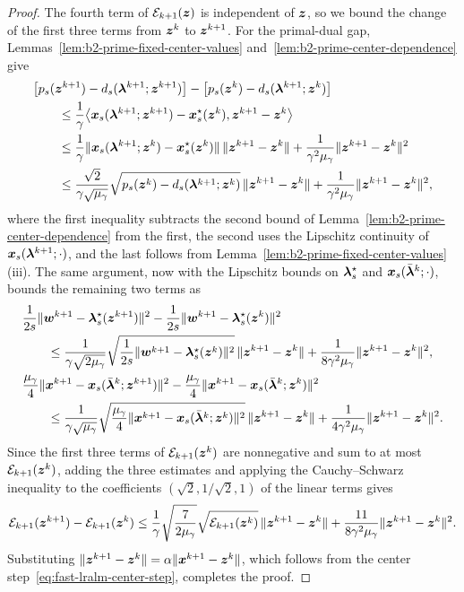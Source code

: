 \begin{proof}
The fourth term of \(\mathcal E_{k+1}(\bm{z})\) is independent of \(\bm{z}\), so
we bound the change of the first three terms from \(\bm{z}^k\) to \(\bm{z}^{k+1}\).
For the primal-dual gap, Lemmas~\ref{lem:b2-prime-fixed-center-values}
and~\ref{lem:b2-prime-center-dependence} give
\begin{align*}
    &\bigl[p_s(\bm{z}^{k+1})-d_s(\bm{\lambda}^{k+1};\bm{z}^{k+1})\bigr]
    -\bigl[p_s(\bm{z}^k)-d_s(\bm{\lambda}^{k+1};\bm{z}^k)\bigr]\\
    &\qquad\le\frac{1}{\gamma}\bigl\langle
    \bm{x}_s(\bm{\lambda}^{k+1};\bm{z}^{k+1})-\bm{x}_s^\star(\bm{z}^k),\bm{z}^{k+1}-\bm{z}^k\bigr\rangle\\
    &\qquad\le\frac{1}{\gamma}\|\bm{x}_s(\bm{\lambda}^{k+1};\bm{z}^k)-\bm{x}_s^\star(\bm{z}^k)\|\,
    \|\bm{z}^{k+1}-\bm{z}^k\|
    +\frac{1}{\gamma^2\mu_\gamma}\|\bm{z}^{k+1}-\bm{z}^k\|^2\\
    &\qquad\le\frac{\sqrt2}{\gamma\sqrt{\mu_\gamma}}
    \sqrt{p_s(\bm{z}^k)-d_s(\bm{\lambda}^{k+1};\bm{z}^k)}\,\|\bm{z}^{k+1}-\bm{z}^k\|
    +\frac{1}{\gamma^2\mu_\gamma}\|\bm{z}^{k+1}-\bm{z}^k\|^2,
\end{align*}
where the first inequality subtracts the second bound of
Lemma~\ref{lem:b2-prime-center-dependence} from the first, the second uses the
Lipschitz continuity of \(\bm{x}_s(\bm{\lambda}^{k+1};\cdot)\), and the last follows
from Lemma~\ref{lem:b2-prime-fixed-center-values}(iii). The same argument, now with the Lipschitz bounds on \(\bm{\lambda}_s^\star\) and
\(\bm{x}_s(\bar{\bm{\lambda}}^k;\cdot)\), bounds the remaining two terms as
\begin{align*}
    &\frac{1}{2s}\|\bm{w}^{k+1}-\bm{\lambda}_s^\star(\bm{z}^{k+1})\|^2
    -\frac{1}{2s}\|\bm{w}^{k+1}-\bm{\lambda}_s^\star(\bm{z}^k)\|^2\\
    &\qquad\le\frac{1}{\gamma\sqrt{2\mu_\gamma}}
    \sqrt{\frac{1}{2s}\|\bm{w}^{k+1}-\bm{\lambda}_s^\star(\bm{z}^k)\|^2}\,
    \|\bm{z}^{k+1}-\bm{z}^k\|
    +\frac{1}{8\gamma^2\mu_\gamma}\|\bm{z}^{k+1}-\bm{z}^k\|^2,\\
    &\frac{\mu_\gamma}{4}\|\bm{x}^{k+1}-\bm{x}_s(\bar{\bm{\lambda}}^k;\bm{z}^{k+1})\|^2
    -\frac{\mu_\gamma}{4}\|\bm{x}^{k+1}-\bm{x}_s(\bar{\bm{\lambda}}^k;\bm{z}^k)\|^2\\
    &\qquad\le\frac{1}{\gamma\sqrt{\mu_\gamma}}
    \sqrt{\frac{\mu_\gamma}{4}\|\bm{x}^{k+1}-\bm{x}_s(\bar{\bm{\lambda}}^k;\bm{z}^k)\|^2}\,
    \|\bm{z}^{k+1}-\bm{z}^k\|
    +\frac{1}{4\gamma^2\mu_\gamma}\|\bm{z}^{k+1}-\bm{z}^k\|^2 .
\end{align*}
Since the first three terms of \(\mathcal E_{k+1}(\bm{z}^k)\) are nonnegative
and sum to at most \(\mathcal E_{k+1}(\bm{z}^k)\), adding the three estimates and
applying the Cauchy--Schwarz inequality to the coefficients
\((\sqrt2,1/\sqrt2,1)\) of the linear terms gives
\[
    \mathcal E_{k+1}(\bm{z}^{k+1})-\mathcal E_{k+1}(\bm{z}^k)
    \le\frac{1}{\gamma}\sqrt{\frac{7}{2\mu_\gamma}}
    \sqrt{\mathcal E_{k+1}(\bm{z}^k)}\,\|\bm{z}^{k+1}-\bm{z}^k\|
    +\frac{11}{8\gamma^2\mu_\gamma}\|\bm{z}^{k+1}-\bm{z}^k\|^2 .
\]
Substituting \(\|\bm{z}^{k+1}-\bm{z}^k\|=\alpha\|\bm{x}^{k+1}-\bm{z}^k\|\), which follows
from the center step~\eqref{eq:fast-lralm-center-step}, completes the proof.
\end{proof}

